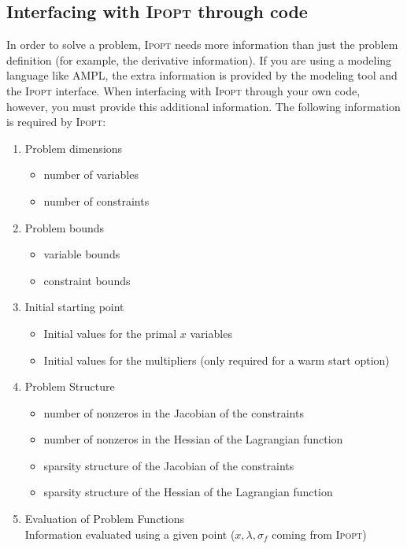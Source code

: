 \documentclass[10pt]{article}
\newcommand{\Ipopt}{\textsc{Ipopt}\xspace}
\begin{document}
\subsection{Interfacing with \Ipopt through code}
\label{sec.required_info}
In order to solve a problem, \Ipopt needs more information than just
the problem definition (for example, the derivative information). If
you are using a modeling language like AMPL, the extra information is
provided by the modeling tool and the \Ipopt interface. When
interfacing with \Ipopt through your own code, however, you must
provide this additional information.
The following information is required by \Ipopt:
\begin{enumerate}
\item Problem dimensions \label{it.prob_dim}
  \begin{itemize}
  \item number of variables
  \item number of constraints
  \end{itemize}
\item Problem bounds
  \begin{itemize}
  \item variable bounds
  \item constraint bounds
  \end{itemize}
\item Initial starting point
  \begin{itemize}
  \item Initial values for the primal $x$ variables
  \item Initial values for the multipliers (only
    required for a warm start option)
  \end{itemize}
\item Problem Structure \label{it.prob_struct}
  \begin{itemize}
  \item number of nonzeros in the Jacobian of the constraints
  \item number of nonzeros in the Hessian of the Lagrangian function
  \item sparsity structure of the Jacobian of the constraints
  \item sparsity structure of the Hessian of the Lagrangian function
  \end{itemize}
\item Evaluation of Problem Functions \label{it.prob_eval} \\
  Information evaluated using a given point ($x,
  \lambda, \sigma_f$ coming from \Ipopt)

\end{enumerate}
\end{document}
